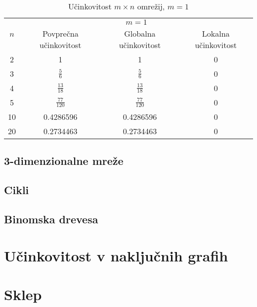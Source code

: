 \documentclass[a4paper, 16pt]{article}
\begin{document}
    \begin{table}[h!]
        \begin{tabular}{c|c|c|c}
            \multirow{2}{*}{$n$} & 
            \multicolumn{3}{c}{$m = 1$}\\
            & Povprečna učinkovitost & Globalna učinkovitost & Lokalna učinkovitost \\ \hline
            2 & 1 & 1 & 0 \\
            3 & $\frac{5}{6}$ & $\frac{5}{6}$ & 0 \\
            4 & $\frac{13}{18}$ & $\frac{13}{18}$ & 0 \\
            5 & $\frac{77}{120}$ & $\frac{77}{120}$ & 0 \\
            10 & 0.4286596 & 0.4286596 & 0\\
            20 & 0.2734463 & 0.2734463 & 0\\

        \end{tabular}
        \caption{Učinkovitost $m \times n$ omrežij, $m = 1$}
        \label{table: 1}
    \end{table}


    \subsection{3-dimenzionalne mreže}

    \subsection{Cikli}

    \subsection{Binomska drevesa}

\section{Učinkovitost v naključnih grafih}

\section{Sklep}
\end{document}
